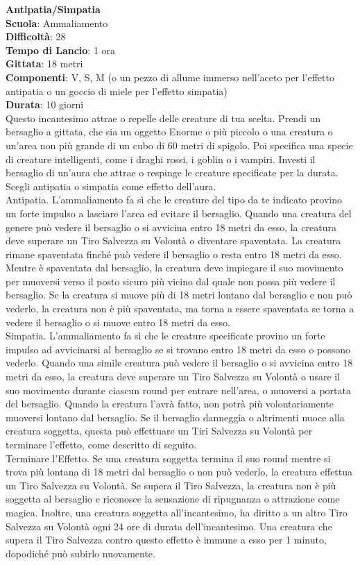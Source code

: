 \begin{multicols}{2}
\medskip\textbf{Antipatia/Simpatia}\\
\textbf{Scuola}: Ammaliamento\\
\textbf{Difficoltà}:  28\\
\textbf{Tempo di Lancio}: 1 ora\\
\textbf{Gittata}: 18 metri\\
\textbf{Componenti}: V, S, M (o un pezzo di allume immerso nell'aceto per l’effetto antipatia o un goccio di miele per l’effetto simpatia)\\
\textbf{Durata}: 10 giorni\\
Questo incantesimo attrae o repelle delle creature di tua scelta. Prendi un bersaglio a gittata, che sia un oggetto Enorme o più piccolo o una creatura o un'area non più grande di un cubo di 60 metri di spigolo. Poi specifica una specie di creature intelligenti, come i draghi rossi, i goblin o i vampiri. Investi il bersaglio di un'aura che attrae o respinge le creature specificate per la durata. Scegli antipatia o simpatia come effetto dell'aura.\\
Antipatia. L’ammaliamento fa sì che le creature del tipo da te indicato provino un forte impulso a lasciare l’area ed evitare il bersaglio. Quando una creatura del genere può vedere il bersaglio o si avvicina entro 18 metri da esso, la creatura deve superare un Tiro Salvezza su Volontà o diventare spaventata. La creatura rimane spaventata finché può vedere il bersaglio o resta entro 18 metri da esso. Mentre è spaventata dal bersaglio, la creatura deve impiegare il suo movimento per muoversi verso il posto sicuro più vicino dal quale non possa più vedere il bersaglio. Se la creatura si muove più di 18 metri lontano dal bersaglio e non può vederlo, la creatura non è più spaventata, ma torna a essere spaventata se torna a vedere il bersaglio o si muove entro 18 metri da esso.\\
Simpatia. L’ammaliamento fa sì che le creature specificate provino un forte impulso ad avvicinarsi al bersaglio se si trovano entro 18 metri da esso o possono vederlo. Quando una simile creatura può vedere il bersaglio o si avvicina entro 18 metri da esso, la creatura deve superare un Tiro Salvezza su Volontà o usare il suo movimento durante ciascun round per entrare nell'area, o muoversi a portata del bersaglio. Quando la creatura l’avrà fatto, non potrà più volontariamente muoversi lontano dal bersaglio. Se il bersaglio danneggia o altrimenti nuoce alla creatura soggetta, questa può effettuare un Tiri Salvezza su Volontà per terminare l’effetto, come descritto di seguito.\\
Terminare l’Effetto. Se una creatura soggetta termina il suo round mentre si trova più lontana di 18 metri dal bersaglio o non può vederlo, la creatura effettua un Tiro Salvezza su Volontà. Se supera il Tiro Salvezza, la creatura non è più soggetta al bersaglio e riconosce la sensazione di ripugnanza o attrazione come magica. Inoltre, una creatura soggetta all'incantesimo, ha diritto a un altro Tiro Salvezza su Volontà ogni 24 ore di durata dell'incantesimo. Una creatura che supera il Tiro Salvezza contro questo effetto è immune a esso per 1 minuto, dopodiché può subirlo nuovamente.


\end{multicols}
